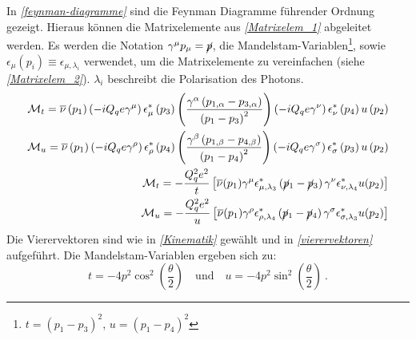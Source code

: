 In \textit{\autoref{feynman-diagramme}} sind die Feynman Diagramme führender Ordnung gezeigt. Hieraus können die Matrixelemente aus \textit{\autoref{Matrixelem_1}} abgeleitet werden. Es werden die Notation $\gamma^\mu p_\mu=\cancel{p}$, die Mandelstam-Variablen\footnote{$t = (p_1 - p_3)^2$, $u = (p_1 - p_4)^2$}, sowie $\epsilon_\mu(p_i) \equiv \epsilon_{\mu, \lambda_i}$ verwendet, um die Matrixelemente zu vereinfachen (siehe \textit{\autoref{Matrixelem_2}}). $\lambda_i$ beschreibt die Polarisation des Photons.
\begin{align}
\begin{split}
\label{Matrixelem_1}
\mathcal{M}_t = \overline{\nu}\left(p_1\right) \left(-iQ_qe\gamma^\mu\right) \epsilon^*_\mu\left(p_3\right) \left(\frac{\gamma^\alpha \left(p_{1,\alpha} - p_{3, \alpha}\right)}{\left(p_1 - p_3\right)^2}\right) \left(-iQ_qe\gamma^\nu\right) \epsilon^*_\nu\left(p_4\right) u\left( p_2\right) \\
\mathcal{M}_u = \overline{\nu}\left(p_1\right) \left(-iQ_qe\gamma^\rho\right) \epsilon^*_\rho\left(p_4\right) \left(\frac{\gamma^\beta \left(p_{1,\beta} - p_{4, \beta}\right)}{\left(p_1 - p_4\right)^2}\right) \left(-iQ_qe\gamma^\sigma\right) \epsilon^*_\sigma\left(p_3\right) u\left( p_2\right)
\end{split}
\\
\begin{split}
\mathcal{M}_t = -\frac{Q_q^2e^2}{t}\left[ \overline{\nu}(p_1) \gamma^\mu \epsilon^*_{\mu, \lambda_3} \left(\cancel{p}_1 - \cancel{p}_3\right) \gamma^\nu \epsilon^*_{\nu, \lambda_4} u(p_2)\right] \\
\mathcal{M}_u = -\frac{Q_q^2e^2}{u}\left[ \overline{\nu}(p_1) \gamma^\rho \epsilon^*_{\rho, \lambda_4} \left(\cancel{p}_1 - \cancel{p}_4\right) \gamma^\sigma \epsilon^*_{\sigma, \lambda_3} u(p_2)\right]
\label{Matrixelem_2}
\end{split}
\end{align}
Die Vierervektoren sind wie in \textit{\autoref{Kinematik}} gewählt und in \textit{\autoref{vierervektoren}} aufgeführt. Die Mandelstam-Variablen ergeben sich zu:
\begin{equation}
t  = -4 p^2 \cos^2\left(\frac{\theta}{2}\right) \quad \text{und} \quad u = -4p^2 \sin^2\left(\frac{\theta}{2}\right)~.
\end{equation} 
